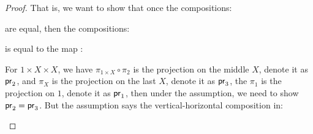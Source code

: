 \documentclass[a4paper]{article}
\DeclareMathOperator{\pr}{\sf pr}
\DeclareMathOperator{\ev}{\text {ev}}
\begin{document}
\begin{proof}
    That is, we want to show that once the compositions:

    \begin{center}
    \end{center}

    \begin{center}
    \end{center}

    are equal, then the compositions:

    \begin{center}
    \end{center}

    is equal to the map :

    \begin{center}
    \end{center}

    For $1\times X\times X$, we have $\pi_{1\times X}\circ \pi_2$ is the projection on the middle $X$, denote it as $\pr_2$, and $\pi_X$ is the projection on the last $X$, denote it as $\pr_3$, the $\pi_1$ is the projection on $1$, denote it as $\pr_1$, then under the assumption, we need to show $\pr_2=\pr_3$. But the assumption says the vertical-horizontal composition in:

    \begin{center}
    \end{center}


\end{proof}
\end{document}
